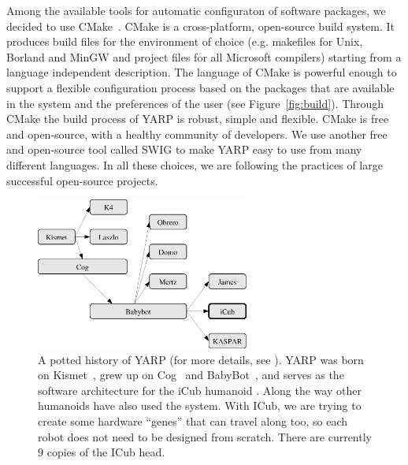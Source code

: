 Among the available tools for automatic configuraton of 
software packages, we decided to use CMake~\cite{cmake}.
CMake is a cross-platform, open-source build system. It 
produces build files for the environment of choice (e.g. 
makefiles for Unix, Borland and MinGW and project files for 
all Microsoft compilers) starting from a language independent 
description. The language of CMake is powerful enough
to support a flexible configuration process based 
on the packages that are available in the system and 
the preferences of the user (see Figure~\ref{fig:build}). Through 
CMake the build process of YARP is robust, simple and 
flexible.
%
%
%
CMake is free and open-source, with a healthy community of 
developers.
%
We use another free and open-source tool called SWIG to make
YARP easy to use from many different languages.
%
In all these choices, we are following the practices of
large successful open-source projects.



\begin{figure}[t]
\begin{center}
\includegraphics[height=5cm]{fig-family}
\caption{
%
\label{fig:family}
%
A potted history of YARP (for more details, see \cite{metta2006yarp}).  YARP was born on Kismet~\cite{breazeal01active},
grew up on Cog~\cite{brooks99cog} and 
BabyBot~\cite{natale05linking}, and serves as the
software architecture for the iCub humanoid \cite{tsagarakis2007icub}.
%
Along the way other humanoids have also used the system.
%
With ICub, we are trying to create some hardware ``genes''
that can travel along too, so each robot does not need to
be designed from scratch.
%
There are currently 9 copies of the ICub head.
%
%
}
\end{center}
\end{figure}



